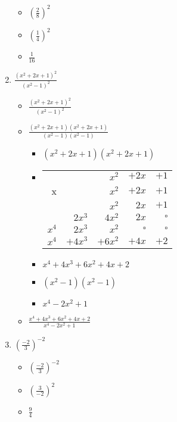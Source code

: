 \documentclass{article}
\begin{document}
\begin{enumerate}
\begin{itemize}
  \item {\Large $(\frac{2}{8})^{2}$}
  \item {\Large $(\frac{1}{4})^{2}$}
  \item {\Large $\frac{1}{16}$}
  \end{itemize}
\item {\Large $\frac{(x^{2}+2x+1)^{2}}{(x^{2}-1)^{2}}$}
  \begin{itemize}
  \item {\Large $\frac{(x^{2}+2x+1)^{2}}{(x^{2}-1)^{2}}$}
  \item {\Large $\frac{(x^{2}+2x+1)(x^{2}+2x+1)}{(x^{2}-1)(x^{2}-1)}$}
    \begin{itemize}
    \item $(x^{2}+2x+1)(x^{2}+2x+1)$
    \item [] \begin{tabular}{rrrrr}
                    &          & $x^{2}$  & $+2x$     &$+1$\\
                   x&          & $x^{2}$  & $+2x$     &$+1$\\\hline
                    &          & $x^{2}$  & $2x$      &$+1$\\
                    & $2x^{3}$ & $4x^{2}$ & $2x$      &$\square$\\
             $x^{4}$& $2x^{3}$ & $x^{2}$  & $\square$ &$\square$\\\hline
             $x^{4}$&$+4x^{3}$ &$+6x^{2}$ & $+4x$     &$+2$\\
           \end{tabular}
    \item $x^{4}+4x^{3}+6x^{2}+4x+2$
    \end{itemize}
    \begin{itemize}
    \item $(x^{2}-1)(x^{2}-1)$
    \item $x^{4}-2x^{2}+1$
    \end{itemize}
  \item {\Large $\frac{x^{4}+4x^{3}+6x^{2}+4x+2}{x^{4}-2x^{2}+1}$}
  \end{itemize}
\item {\Large $(\frac{-2}{3})^{-2}$}
  \begin{itemize}
  \item {\Large $(\frac{-2}{3})^{-2}$}
  \item {\Large $(\frac{3}{-2})^{2}$}
  \item {\Large $\frac{9}{4}$}
  \end{itemize}

\end{enumerate}
\end{document}
